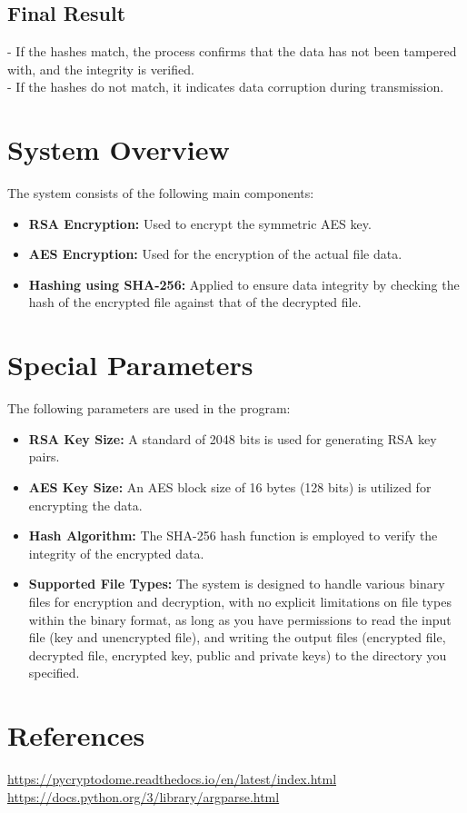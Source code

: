 \documentclass{article}
\begin{document}
\subsection*{Final Result}

- If the hashes match, the process confirms that the data has not been tampered with, and the integrity is verified. \\
- If the hashes do not match, it indicates data corruption during transmission. \\

\section{System Overview}
The system consists of the following main components:

\begin{itemize}
    \item \textbf{RSA Encryption:} Used to encrypt the symmetric AES key.
    \item \textbf{AES Encryption:} Used for the encryption of the actual file data.
    \item \textbf{Hashing using SHA-256:} Applied to ensure data integrity by checking the hash of the encrypted file against that of the decrypted file. 
\end{itemize}

\section{Special Parameters}
The following parameters are used in the program:
\begin{itemize}
    \item \textbf{RSA Key Size:} A standard of 2048 bits is used for generating RSA key pairs.
    \item \textbf{AES Key Size:} An AES block size of 16 bytes (128 bits) is utilized for encrypting the data.
    \item \textbf{Hash Algorithm:} The SHA-256 hash function is employed to verify the integrity of the encrypted data.
    \item \textbf{Supported File Types:} The system is designed to handle various binary files for encryption and decryption, with no explicit limitations on file types within the binary format, as long as you have permissions to read the input file (key and unencrypted file), and writing the output files (encrypted file, decrypted file, encrypted key, public and private keys) to the directory you specified.
\end{itemize}

\section{References}
\href{PyCryptodome documentation}{https://pycryptodome.readthedocs.io/en/latest/index.html} \\
\href{ArgParse documentation}{https://docs.python.org/3/library/argparse.html}
\end{document}
